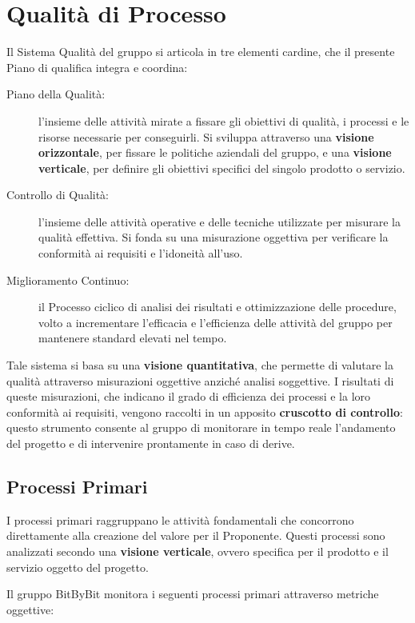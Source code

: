 \documentclass[a4paper,12pt]{article}
\begin{document}
\section{Qualità di Processo}\label{sec:qualità_processo}
Il Sistema Qualità del gruppo si articola in tre elementi cardine, che il presente Piano di qualifica integra e coordina:

\begin{description}
    \item[Piano della Qualità:] l'insieme delle attività mirate a fissare gli obiettivi di qualità, i processi e le risorse necessarie per conseguirli. Si sviluppa attraverso una \textbf{visione orizzontale}, per fissare le politiche aziendali del gruppo, e una \textbf{visione verticale}, per definire gli obiettivi specifici del singolo prodotto o servizio.
    \item[Controllo di Qualità:] l'insieme delle attività operative e delle tecniche utilizzate per misurare la qualità effettiva. Si fonda su una misurazione oggettiva per verificare la conformità ai requisiti e l'idoneità all'uso.
    \item[Miglioramento Continuo:] il Processo ciclico di analisi dei risultati e ottimizzazione delle procedure, volto a incrementare l'efficacia e l'efficienza delle attività del gruppo per mantenere standard elevati nel tempo.
\end{description}

Tale sistema si basa su una \textbf{visione quantitativa}, che permette di valutare la qualità attraverso misurazioni oggettive anziché analisi soggettive. I risultati di queste misurazioni, che indicano il grado di efficienza dei processi e la loro conformità ai requisiti, vengono raccolti in un apposito \textbf{cruscotto di controllo}: questo strumento consente al gruppo di monitorare in tempo reale l'andamento del progetto e di intervenire prontamente in caso di derive.

\subsection{Processi Primari}\label{sec:processi_primari}
I processi primari raggruppano le attività fondamentali che concorrono direttamente alla creazione del valore per il Proponente. Questi processi sono analizzati secondo una \textbf{visione verticale}, ovvero specifica per il prodotto e il servizio oggetto del progetto. 

Il gruppo BitByBit monitora i seguenti processi primari attraverso metriche oggettive:
\end{document}
